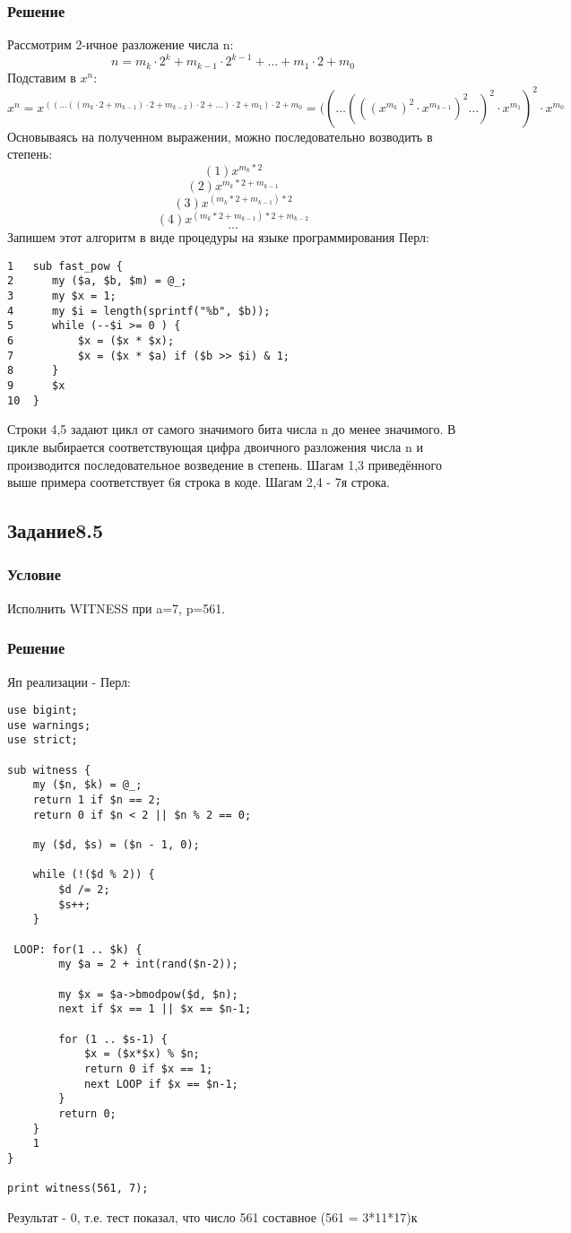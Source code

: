 \documentclass[10pt,a4paper]{article}
\begin{document}
\subsubsection*{Решение}
Рассмотрим 2-ичное разложение числа n:
$$    n=m_{k} \cdot 2^{k}+m_{k-1} \cdot 2^{k-1}+\dots+m_{1} \cdot 2+m_{0} $$
Подставим в  $ x^n $:
$$  x^{n}=x^{((\dots((m_{k} \cdot 2+m_{k-1}) \cdot 2+m_{k-2}) \cdot
  2+\dots) \cdot 2+m_{1}) \cdot 2 + m_{0}}=((\dots(((x^{m_{k}})^{2}
\cdot x^{m_{k-1}})^{2}\dots)^{2} \cdot x^{m_{1}})^2 \cdot x^{m_{0}} $$
Основываясь на полученном выражении, можно последовательно возводить в
степень:
$$(1) x^{m_k*2} $$
$$(2) x^{m_k*2 + m_{k-1}} $$
$$(3) x^{(m_k*2 + m_{k-1})*2} $$
$$(4) x^{(m_k*2 + m_{k-1})*2 + m_{k-2}} $$
$$...$$
Запишем этот алгоритм в виде процедуры на языке программирования Перл:
\begin{lstlisting}
1   sub fast_pow {
2      my ($a, $b, $m) = @_;
3      my $x = 1;
4      my $i = length(sprintf("%b", $b));
5      while (--$i >= 0 ) {
6          $x = ($x * $x);
7          $x = ($x * $a) if ($b >> $i) & 1;
8      }
9      $x
10  }
\end{lstlisting}
Строки 4,5 задают цикл от самого значимого бита числа n до менее
значимого. В цикле выбирается соответствующая цифра двоичного разложения
числа n и производится последовательное возведение в степень. Шагам
1,3 приведённого выше примера соответствует 6я строка в коде. Шагам
2,4 - 7я строка.

\subsection*{Задание8.5}
\subsubsection*{Условие}
Исполнить WITNESS при a=7, p=561.
\subsubsection*{Решение}
Яп реализации - Перл:
\begin{lstlisting}
use bigint;
use warnings;
use strict;

sub witness {
    my ($n, $k) = @_;
    return 1 if $n == 2;
    return 0 if $n < 2 || $n % 2 == 0;

    my ($d, $s) = ($n - 1, 0);

    while (!($d % 2)) {
        $d /= 2;
        $s++;
    }

 LOOP: for(1 .. $k) {
        my $a = 2 + int(rand($n-2));

        my $x = $a->bmodpow($d, $n);
        next if $x == 1 || $x == $n-1;

        for (1 .. $s-1) {
            $x = ($x*$x) % $n;
            return 0 if $x == 1;
            next LOOP if $x == $n-1;
        }
        return 0;
    }
    1
}

print witness(561, 7);
\end{lstlisting}
Результат - 0, т.е. тест показал, что число 561 составное (561 = 3*11*17)к
\end{document}
